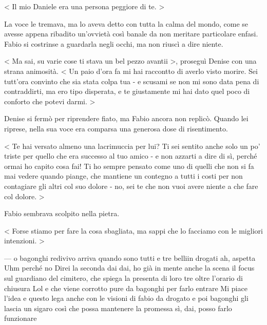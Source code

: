 < Il mio Daniele era una persona peggiore di te. >

La voce le tremava, ma lo aveva detto con tutta la calma del mondo, come se avesse appena ribadito un'ovvietà così banale da non meritare particolare enfasi. Fabio si costrinse a guardarla negli occhi, ma non riuscì a dire niente.

< Ma sai, su varie cose ti stava un bel pezzo avantii >, proseguì Denise con una strana animosità. < Un paio d'ora fa mi hai raccontto di averlo visto morire. Sei tutt'ora convinto che sia stata colpa tua - e scusami se non mi sono data pena di contraddirti, ma ero tipo disperata, e te giustamente mi hai dato quel poco di conforto che potevi darmi. >

Denise si fermò per riprendere fiato, ma Fabio ancora non replicò. Quando lei riprese, nella sua voce era comparsa una generosa dose di risentimento.

< Te hai versato almeno una lacrimuccia per lui? Ti sei sentito anche solo un po' triste per quello che era successo al tuo amico - e non azzarti a dire di sì, perché ormai ho capito cosa fai! Ti ho sempre pensato come uno di quelli che non si fa mai vedere quando piange, che mantiene un contegno a tutti i costi per non contagiare gli altri col suo dolore - no, sei te che non vuoi avere niente a che fare col dolore. >

Fabio sembrava scolpito nella pietra.

< Forse stiamo per fare la cosa sbagliata, ma sappi che lo facciamo con le migliori intenzioni. >


---
o bagonghi redivivo arriva quando sono tutti e tre belliin drogati
ah, aspetta
Uhm
perché no
Direi la seconda
dai dai, ho già in mente anche la scena
il focus sul guardiano del cimitero, che spiega la presenta di loro tre oltre l'orario di chiusura
Lol
e che viene corrotto pure da bagonghi per farlo entrare
Mi piace l’idea
e questo lega anche con le visioni di fabio da drogato
e poi bagonghi gli lascia un sigaro
così che possa mantenere la promessa
sì, dai, posso farlo funzionare